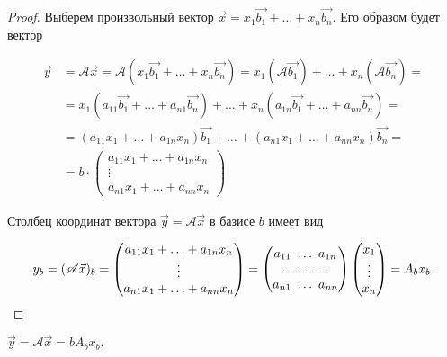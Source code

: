 \begin{proof}
    Выберем произвольный вектор $\vec{x} = x_1\vec{b_1} + \ldots + x_n\vec{b_n}$. Его образом будет вектор

    \begin{align*}
        \vec{y} &= \mathscr{A}\vec{x} =  \mathscr{A}(x_1\vec{b_1} + \ldots + x_n\vec{b_n}) = x_1(\mathscr{A}\vec{b_1}) + \ldots + x_n(\mathscr{A}\vec{b_n}) = \\
        &= x_1(a_{11}\vec{b_1} + \ldots + a_{n1}\vec{b_n}) + \ldots + x_n(a_{1n}\vec{b_1} + \ldots + a_{nn}\vec{b_n}) = \\
        &= (a_{11}x_1 + \ldots + a_{1n}x_n)\vec{b_1} + \ldots + (a_{n1}x_1 + \ldots + a_{nn}x_n)\vec{b_n} = \\
        &= b \cdot \begin{pmatrix} 
            a_{11}x_1 + \ldots + a_{1n}x_n \\
            \vdots \\
            a_{n1}x_1 + \ldots + a_{nn}x_n
        \end{pmatrix}
    \end{align*}

    Столбец координат вектора $\vec{y} = \mathscr{A}\vec{x}$ в базисе $b$ имеет вид

    \begin{equation*}
        y_b = (\mathscr{A}\vec{x})_b = \begin{pmatrix} 
            a_{11}x_1 + \ldots + a_{1n}x_n \\
            \vdots \\
            a_{n1}x_1 + \ldots + a_{nn}x_n
        \end{pmatrix} =
        \begin{pmatrix} 
            a_{11} \thinspace \thinspace \ldots \thinspace \thinspace a_{1n} \\
            \ldots \ldots \ldots \\
            a_{n1} \thinspace \thinspace \ldots \thinspace \thinspace a_{nn}
        \end{pmatrix}
        \begin{pmatrix} 
            x_1 \\
            \vdots \\
            x_n
        \end{pmatrix} = A_bx_b
    .\end{equation*}
\end{proof}

\begin{corollary}
    $\vec{y} = \mathscr{A}\vec{x} = bA_bx_b.$
\end{corollary}


